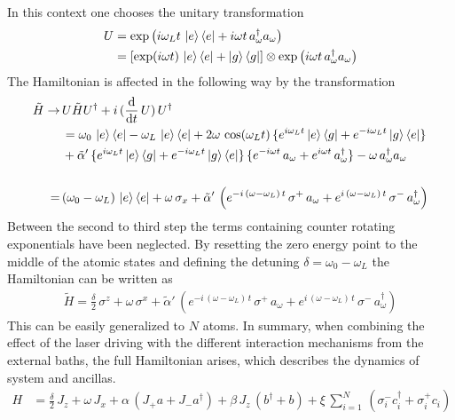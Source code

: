 In this context one chooses the unitary transformation 
\begin{align*}
    U&=\exp\left(i\omega_L t\,\ket{e}\bra{e}+i\omega t\,a_\omega^\dagger a_\omega\right)\\
    &=\left[ \exp(i\omega t)\,\ket{e}\bra{e}+\ket{g}\bra{g} \right]\otimes \exp\left( i\omega t\,a_\omega^\dagger a_\omega \right)
\end{align*}
The Hamiltonian is affected in the following way by the transformation
\begin{align*}
    \tilde{H}\rightarrow \,&U\tilde{H}U^\dagger+i\,(\frac{\text{d}}{\text{d} t}\,U)\,U^\dagger\\
    &=\omega_0\,\ket{e}\bra{e}-\omega_L\,\ket{e}\bra{e} + 2\omega\,\cos(\omega_L t)\,\{e^{i\omega_L t} \ket{e}\bra{g}+e^{-i\omega_L t}\ket{g}\bra{e}\}\\
    &+\tilde{\alpha}'\,\{e^{i\omega_L t} \ket{e}\bra{g}+e^{-i\omega_L t}\ket{g}\bra{e}\}\,\{ e^{-i\omega t} \,a_\omega+e^{i\omega t}\,a_\omega^\dagger  \}-\omega\,a^\dagger_\omega a_\omega\\\\
    =\,&(\omega_0-\omega_L)\,\ket{e}\bra{e}+\omega\,\sigma_x+\tilde{\alpha}'\,\left( e^{-i\,(\omega-\omega_L)\, t}\,\sigma^+\,a_\omega+e^{i\,(\omega-\omega_L)\, t}\,\sigma^-\,a^\dagger_\omega \right)
\end{align*}
Between the second to third step the terms containing counter rotating exponentials have been neglected. By resetting the zero energy point to the middle of the atomic states and defining the detuning $\delta=\omega_0-\omega_L$ the Hamiltonian can be written as
\begin{align*}
    \tilde{H} = \frac{\delta}{2}\,\sigma^z+ \omega\,\sigma^x+\tilde{\alpha}'\,\left( e^{-i\,(\omega-\omega_L)\, t}\,\sigma^+\,a_\omega+e^{i\,(\omega-\omega_L)\, t}\,\sigma^-\,a^\dagger_\omega \right)
\end{align*}
This can be easily generalized to $N$ atoms.
In summary, when combining the effect of the laser driving with the different interaction mechanisms from the external baths, the full Hamiltonian arises, which describes the dynamics of system and ancillas.
\begin{align}\label{eq:full_Ham}
    H &= \frac{\delta}{2}\,J_z+ \omega\,J_x+\alpha\,(J_+a + J_-a^\dagger)+ \beta\,J_z\,(b^\dagger+b)+\xi\,\sum_{i=1}^N\,(\sigma_i^-c_i^\dagger+\sigma_i^+c_i)
\end{align}



